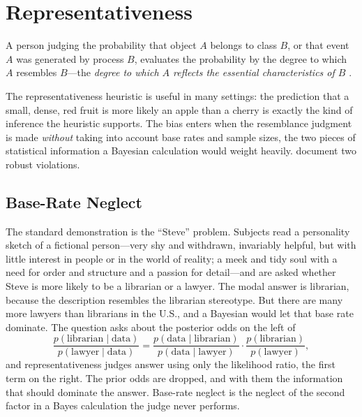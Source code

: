 \section{Representativeness}
\label{sec:representativeness}

\begin{definition}
\label{def:representativeness}
A person judging the probability that object $A$ belongs to class $B$, or that event $A$ was generated by process $B$, evaluates the probability by the degree to which $A$ resembles $B$---the \emph{degree to which $A$ reflects the essential characteristics of $B$} \citep{kahneman1974}.
\end{definition}

The representativeness heuristic is useful in many settings: the prediction that a small, dense, red fruit is more likely an apple than a cherry is exactly the kind of inference the heuristic supports. The bias enters when the resemblance judgment is made \emph{without} taking into account base rates and sample sizes, the two pieces of statistical information a Bayesian calculation would weight heavily. \citet{kahneman1974} document two robust violations.

\subsection{Base-Rate Neglect}

The standard demonstration is the ``Steve'' problem. Subjects read a personality sketch of a fictional person---very shy and withdrawn, invariably helpful, but with little interest in people or in the world of reality; a meek and tidy soul with a need for order and structure and a passion for detail---and are asked whether Steve is more likely to be a librarian or a lawyer. The modal answer is librarian, because the description resembles the librarian stereotype. But there are many more lawyers than librarians in the U.S., and a Bayesian would let that base rate dominate. The question asks about the posterior odds on the left of
\[
\frac{p(\text{librarian}\mid\text{data})}{p(\text{lawyer}\mid\text{data})}
=
\frac{p(\text{data}\mid\text{librarian})}{p(\text{data}\mid\text{lawyer})}
\cdot
\frac{p(\text{librarian})}{p(\text{lawyer})},
\]
and representativeness judges answer using only the likelihood ratio, the first term on the right. The prior odds are dropped, and with them the information that should dominate the answer. Base-rate neglect is the neglect of the second factor in a Bayes calculation the judge never performs.

